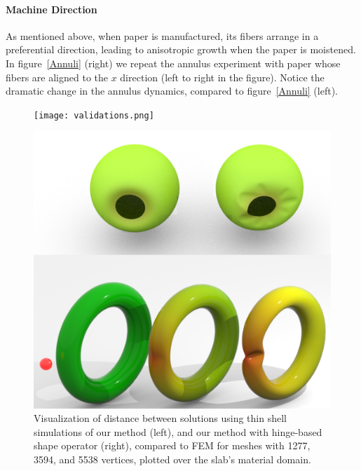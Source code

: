 \documentclass[timestamp,acmtog]{acmart}
\begin{document}
\paragraph{Machine Direction}
As mentioned above, when paper is manufactured, its fibers arrange in a preferential direction, leading to anisotropic growth when the paper is moistened. In figure~\ref{Annuli} (right) we repeat the annulus experiment with paper whose fibers are aligned to the $x$ direction (left to right in the figure). Notice the dramatic change in the annulus dynamics, compared to figure~\ref{Annuli} (left).

\begin{figure}[!h]
\begin{minipage}[t]{0.45\linewidth} 
    \centering
    \texttt{[image: validations.png]}
    \caption{Visualization of distance between solutions using thin shell simulations of our method (left), and our method with hinge-based shape operator (right), compared to FEM for meshes with 1277, 3594, and 5538 vertices, plotted over the slab's material domain.}    
    \label{fig:validation}
\end{minipage}
\hspace{0.1cm}
\begin{minipage}[t]{0.45\linewidth} 
    \centering
    \includegraphics[width=1\textwidth]{TorusandSphere.png}

\end{minipage}
\end{figure}
\end{document}
